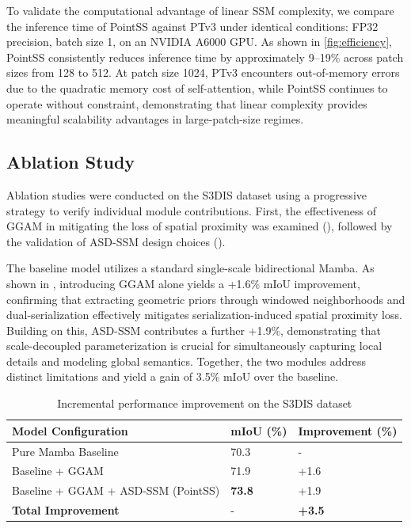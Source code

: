 \documentclass[letterpaper,journal]{IEEEtran}
\begin{document}
To validate the computational advantage of linear SSM complexity, we compare the inference time of PointSS against PTv3 under identical conditions: FP32 precision, batch size 1, on an NVIDIA A6000 GPU. As shown in \cref{fig:efficiency}, PointSS consistently reduces inference time by approximately 9--19\% across patch sizes from 128 to 512. At patch size 1024, PTv3 encounters out-of-memory errors due to the quadratic memory cost of self-attention, while PointSS continues to operate without constraint, demonstrating that linear complexity provides meaningful scalability advantages in large-patch-size regimes.

\subsection{Ablation Study}

Ablation studies were conducted on the S3DIS dataset using a progressive strategy to verify individual module contributions. First, the effectiveness of GGAM in mitigating the loss of spatial proximity was examined (), followed by the validation of ASD-SSM design choices ().

The baseline model utilizes a standard single-scale bidirectional Mamba. As shown in , introducing GGAM alone yields a +1.6\% mIoU improvement, confirming that extracting geometric priors through windowed neighborhoods and dual-serialization effectively mitigates serialization-induced spatial proximity loss. Building on this, ASD-SSM contributes a further +1.9\%, demonstrating that scale-decoupled parameterization is crucial for simultaneously capturing local details and modeling global semantics. Together, the two modules address distinct limitations and yield a gain of 3.5\% mIoU over the baseline.

\begin{table}[!t]
\centering
\caption{Incremental performance improvement on the S3DIS dataset}
\label{tab:progressive_improvement}
\begin{tabular}{lll}
\toprule
\textbf{Model Configuration} & \textbf{mIoU (\%)} & \textbf{Improvement (\%)} \\
\midrule
Pure Mamba Baseline & 70.3 & - \\
Baseline + GGAM & 71.9 & +1.6 \\
Baseline + GGAM + ASD-SSM (PointSS) & \textbf{73.8} & +1.9 \\
\midrule
\textbf{Total Improvement} & - & \textbf{+3.5} \\
\bottomrule
\end{tabular}
\end{table}
\end{document}
